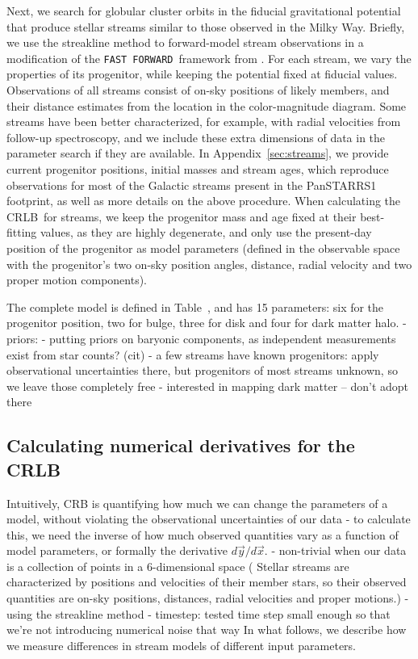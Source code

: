 \documentclass[modern]{aastex61}
\newcommand{\acronym}[1]{{\small{#1}}}
\newcommand{\CRLB}{\acronym{CRLB}}
\newcommand{\FF}{\texttt{FAST FORWARD}}
\begin{document}
Next, we search for globular cluster orbits in the fiducial gravitational potential that produce stellar streams similar to those observed in the Milky Way.
Briefly, we use the streakline method to forward-model stream observations in a modification of the \FF\ framework from \citet{bonaca2014}.
For each stream, we vary the properties of its progenitor, while keeping the potential fixed at fiducial values.
Observations of all streams consist of on-sky positions of likely members, and their distance estimates from the location in the color-magnitude diagram.
Some streams have been better characterized, for example, with radial velocities from follow-up spectroscopy, and we include these extra dimensions of data in the parameter search if they are available.
In Appendix~\ref{sec:streams}, we provide current progenitor positions, initial masses and stream ages, which reproduce observations for most of the Galactic streams present in the PanSTARRS1 footprint, as well as more details on the above procedure.
When calculating the \CRLB\ for streams, we keep the progenitor mass and age fixed at their best-fitting values, as they are highly degenerate, and only use the present-day position of the progenitor as model parameters (defined in the observable space with the progenitor's two on-sky position angles, distance, radial velocity and two proper motion components). 

The complete model is defined in Table~, and has 15 parameters: six for the progenitor position, two for bulge, three for disk and four for dark matter halo.
- priors:
- putting priors on baryonic components, as independent measurements exist from star counts? (cit)
- a few streams have known progenitors: apply observational uncertainties there, but progenitors of most streams unknown, so we leave those completely free
- interested in mapping dark matter -- don't adopt there

\subsection{Calculating numerical derivatives for the \CRLB}
\label{sec:derivatives}
Intuitively, CRB is quantifying how much we can change the parameters of a model, without violating the observational uncertainties of our data
- to calculate this, we need the inverse of how much observed quantities vary as a function of model parameters, or formally the derivative $d\vec{y}/d\vec{x}$.
- non-trivial when our data is a collection of points in a 6-dimensional space ( Stellar streams are characterized by positions and velocities of their member stars, so their observed quantities are on-sky positions, distances, radial velocities and proper motions.)
- using the streakline method \citep{bonaca2014}
- timestep: tested time step small enough so that we're not introducing numerical noise that way
In what follows, we describe how we measure differences in stream models of different input parameters.
\end{document}
